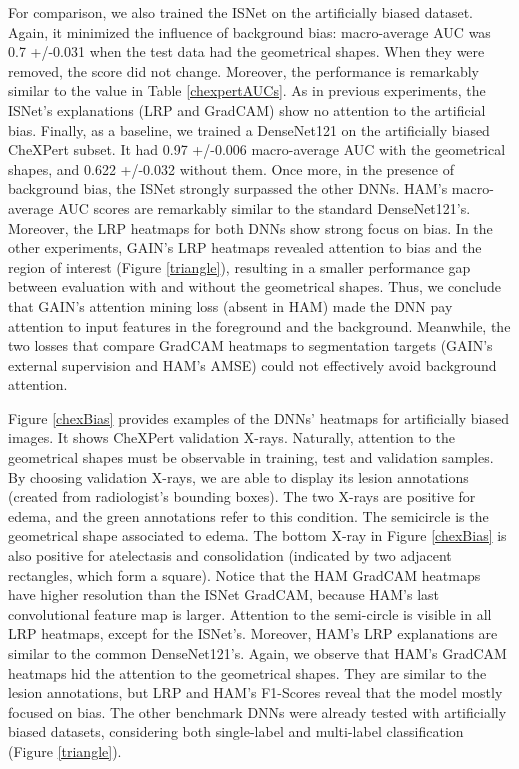 \documentclass[fleqn,10pt]{wlscirep}
\begin{document}
{For comparison, we also trained the ISNet on the artificially biased dataset. Again, it minimized the influence of background bias: macro-average AUC was 0.7 +/-0.031 when the test data had the geometrical shapes. When they were removed, the score did not change. Moreover, the performance is remarkably similar to the value in Table \ref{chexpertAUCs}. As in previous experiments, the ISNet's explanations (LRP and GradCAM) show no attention to the artificial bias. Finally, as a baseline, we trained a DenseNet121 on the artificially biased CheXPert subset. It had 0.97 +/-0.006 macro-average AUC with the geometrical shapes, and 0.622 +/-0.032 without them. Once more, in the presence of background bias, the ISNet strongly surpassed the other DNNs. HAM's macro-average AUC scores are remarkably similar to the standard DenseNet121's. Moreover, the LRP heatmaps for both DNNs show strong focus on bias. In the other experiments, GAIN's LRP heatmaps revealed attention to bias and the region of interest (Figure \ref{triangle}), resulting in a smaller performance gap between evaluation with and without the geometrical shapes. Thus, we conclude that GAIN's attention mining loss (absent in HAM) made the DNN pay attention to input features in the foreground and the background. Meanwhile, the two losses that compare GradCAM heatmaps to segmentation targets (GAIN's external supervision and HAM's AMSE) could not effectively avoid background attention.

Figure \ref{chexBias} provides examples of the DNNs' heatmaps for artificially biased images. It shows CheXPert validation X-rays. Naturally, attention to the geometrical shapes must be observable in training, test and validation samples. By choosing validation X-rays, we are able to display its lesion annotations (created from radiologist's bounding boxes\cite{HAM}). The two X-rays are positive for edema, and the green annotations refer to this condition. The semicircle is the geometrical shape associated to edema. The bottom X-ray in Figure \ref{chexBias} is also positive for atelectasis and consolidation (indicated by two adjacent rectangles, which form a square). Notice that the HAM GradCAM heatmaps have higher resolution than the ISNet GradCAM, because HAM's last convolutional feature map is larger. Attention to the semi-circle is visible in all LRP heatmaps, except for the ISNet's. Moreover, HAM's LRP explanations are similar to the common DenseNet121's. Again, we observe that HAM's GradCAM heatmaps hid the attention to the geometrical shapes. They are similar to the lesion annotations, but LRP and HAM's F1-Scores reveal that the model mostly focused on bias. The other benchmark DNNs were already tested with artificially biased datasets, considering both single-label and multi-label classification (Figure \ref{triangle}).

}
\end{document}
